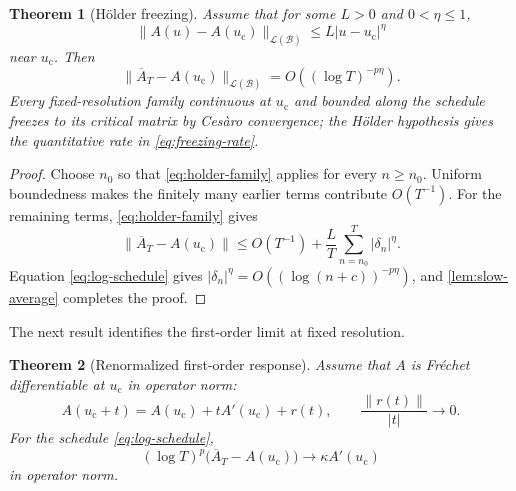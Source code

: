 \documentclass[11pt]{article}
\newtheorem{theorem}{Theorem}[section]
\theoremstyle{definition}
\theoremstyle{remark}
\newcommand{\uc}{u_{\mathrm c}}
\newcommand{\cB}{\mathcal B}
\newcommand{\cL}{\mathcal L}
\begin{document}
\begin{theorem}[H\"older freezing]\label{thm:holder-freezing}
Assume that for some $L>0$ and $0<\eta\le1$,
\begin{equation}\label{eq:holder-family}
    \|A(u)-A(\uc)\|_{\cL(\cB)}
    \le L|u-\uc|^\eta
\end{equation}
near $\uc$.  Then
\begin{equation}\label{eq:freezing-rate}
    \|\overline A_T-A(\uc)\|_{\cL(\cB)}
    =O\left((\log T)^{-p\eta}\right).
\end{equation}
Every fixed-resolution family continuous at $\uc$ and bounded along the schedule freezes to its critical matrix by Ces\`aro convergence; the H\"older hypothesis gives the quantitative rate in \eqref{eq:freezing-rate}.
\end{theorem}

\begin{proof}
Choose $n_0$ so that \eqref{eq:holder-family} applies for every $n\ge n_0$.  Uniform boundedness makes the finitely many earlier terms contribute $O(T^{-1})$.  For the remaining terms, \eqref{eq:holder-family} gives
\[
    \|\overline A_T-A(\uc)\|
    \le O(T^{-1})+\frac LT\sum_{n=n_0}^T|\delta_n|^\eta.
\]
Equation \eqref{eq:log-schedule} gives $|\delta_n|^\eta=O((\log(n+c))^{-p\eta})$, and \cref{lem:slow-average} completes the proof.
\end{proof}

The next result identifies the first-order limit at fixed resolution.

\begin{theorem}[Renormalized first-order response]\label{thm:response}
Assume that $A$ is Fr\'{e}chet differentiable at $\uc$ in operator norm:
\begin{equation}\label{eq:frechet}
    A(\uc+t)=A(\uc)+tA'(\uc)+r(t),
    \qquad
    \frac{\|r(t)\|}{|t|}\longrightarrow0.
\end{equation}
For the schedule \eqref{eq:log-schedule},
\begin{equation}\label{eq:response-limit}
    (\log T)^p\bigl(\overline A_T-A(\uc)\bigr)
    \longrightarrow \kappa A'(\uc)
\end{equation}
in operator norm.
\end{theorem}
\end{document}
